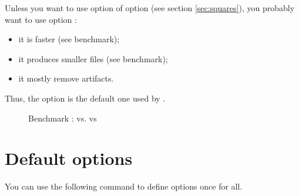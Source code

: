 \documentclass[
  load-preamble-,
  babel-options=english,
  add-index=true,
]{cnltx-doc}
\begin{document}
Unless you want to use option  of option  (see section \ref{sec:squares}), you probably want to use option :
\begin{itemize}
  \item it is faster (see benchmark);
  \item it produces smaller files (see benchmark);
  \item it mostly remove artifacts.
\end{itemize}

Thus, the  option is the default one used by .

\begin{figure}
  \centering

  \caption{Benchmark :  vs.  vs }
  \label{fig:benchmark}
\end{figure}

\section{Default options}

You can use the following command to define options once for all.
\end{document}
